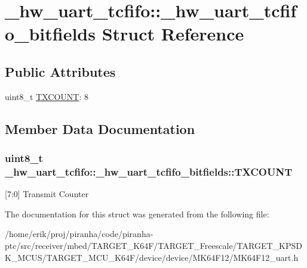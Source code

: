 \hypertarget{struct__hw__uart__tcfifo_1_1__hw__uart__tcfifo__bitfields}{}\section{\+\_\+hw\+\_\+uart\+\_\+tcfifo\+:\+:\+\_\+hw\+\_\+uart\+\_\+tcfifo\+\_\+bitfields Struct Reference}
\label{struct__hw__uart__tcfifo_1_1__hw__uart__tcfifo__bitfields}
\subsection*{Public Attributes}
\begin{DoxyCompactItemize}
\item 
uint8\+\_\+t \hyperlink{struct__hw__uart__tcfifo_1_1__hw__uart__tcfifo__bitfields_a74f80f434585970caa579e4bfd14502c}{T\+X\+C\+O\+U\+NT}\+: 8
\end{DoxyCompactItemize}


\subsection{Member Data Documentation}
\subsubsection[{\texorpdfstring{T\+X\+C\+O\+U\+NT}{TXCOUNT}}]{\setlength{\rightskip}{0pt plus 5cm}uint8\+\_\+t \+\_\+hw\+\_\+uart\+\_\+tcfifo\+::\+\_\+hw\+\_\+uart\+\_\+tcfifo\+\_\+bitfields\+::\+T\+X\+C\+O\+U\+NT}\hypertarget{struct__hw__uart__tcfifo_1_1__hw__uart__tcfifo__bitfields_a74f80f434585970caa579e4bfd14502c}{}\label{struct__hw__uart__tcfifo_1_1__hw__uart__tcfifo__bitfields_a74f80f434585970caa579e4bfd14502c}
\mbox{[}7\+:0\mbox{]} Transmit Counter 

The documentation for this struct was generated from the following file\+:\begin{DoxyCompactItemize}
\item 
/home/erik/proj/piranha/code/piranha-\/ptc/src/receiver/mbed/\+T\+A\+R\+G\+E\+T\+\_\+\+K64\+F/\+T\+A\+R\+G\+E\+T\+\_\+\+Freescale/\+T\+A\+R\+G\+E\+T\+\_\+\+K\+P\+S\+D\+K\+\_\+\+M\+C\+U\+S/\+T\+A\+R\+G\+E\+T\+\_\+\+M\+C\+U\+\_\+\+K64\+F/device/device/\+M\+K64\+F12/M\+K64\+F12\+\_\+uart.\+h\end{DoxyCompactItemize}
